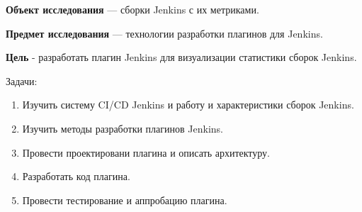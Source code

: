 \textbf{Объект исследования} — сборки Jenkins с их метриками.

\textbf{Предмет исследования} — технологии разработки плагинов для Jenkins.

\textbf{Цель} - разработать плагин Jenkins для визуализации статистики сборок Jenkins.

Задачи:
 
\begin{enumerate}
	\item Изучить систему CI/CD Jenkins и работу и характеристики сборок Jenkins.
	
	\item Изучить методы разработки плагинов Jenkins.
	
	\item Провести проектировани плагина и описать архитектуру.
	
	\item Разработать код плагина.
	
	\item Провести тестирование и аппробацию плагина. 
	
\end{enumerate}




